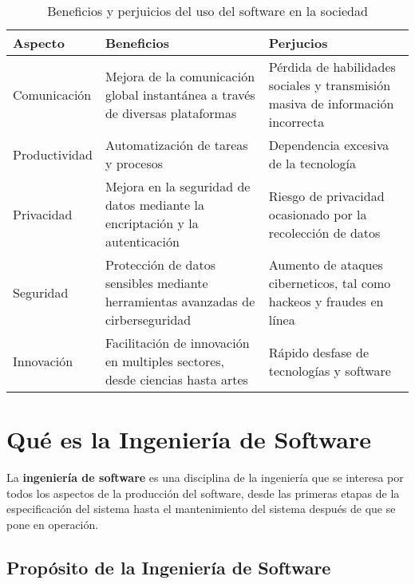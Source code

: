 \documentclass[11pt, a4paper]{article} %
\begin{document}
    \begin{table}[h]
        \centering
        \begin{tabular}{|p{}|p{}|p{}|}
            \hline
            Aspecto       & Beneficios                                                                       & Perjucios                                                                      \\
            \hline
            Comunicación  & Mejora de la comunicación global instantánea a través de diversas plataformas    & Pérdida de habilidades sociales y transmisión masiva de información incorrecta \\
            \hline
            Productividad & Automatización de tareas y procesos                                              & Dependencia excesiva de la tecnología                                          \\
            \hline
            Privacidad    & Mejora en la seguridad de datos mediante la encriptación y la autenticación      & Riesgo de privacidad ocasionado por la recolección de datos                    \\
            \hline
            Seguridad     & Protección de datos sensibles mediante herramientas avanzadas de cirberseguridad & Aumento de ataques ciberneticos, tal como hackeos y fraudes en línea           \\
            \hline
            Innovación    & Facilitación de innovación en multiples sectores, desde ciencias hasta artes     & Rápido desfase de tecnologías y software                                       \\
            \hline
        \end{tabular}
        \caption{Beneficios y perjuicios del uso del software en la sociedad}
    \end{table}

    \clearpage
    \section{Qué es la Ingeniería de Software}

    La \textbf{ingeniería de software} es una disciplina de la ingeniería que se interesa
    por todos los aspectos de la producción del software, desde las primeras etapas de la especificación
    del sistema hasta el mantenimiento del sistema después de que se pone en operación.

    \subsection{Propósito de la Ingeniería de Software}
\end{document}
